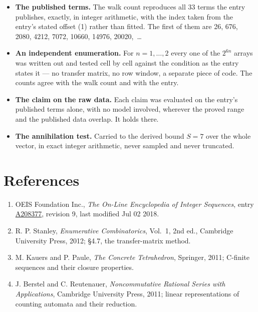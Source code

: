 \documentclass[11pt]{article}
\theoremstyle{definition}
\begin{document}
\begin{itemize}

\item {\bfseries The published terms.} The walk count reproduces all 33 terms the entry publishes, exactly, in integer arithmetic, with the index taken from the entry's stated offset (1) rather than fitted. The first of them are 26, 676, 2080, 4212, 7072, 10660, 14976, 20020,~\dots

\item {\bfseries An independent enumeration.} For $n = 1,\dots,2$ every one of the $2^{6n}$ arrays was written out and tested cell by cell against the condition as the entry states it --- no transfer matrix, no row window, a separate piece of code. The counts agree with the walk count and with the entry.

\item {\bfseries The claim on the raw data.} Each claim was evaluated on the entry's published terms alone, with no model involved, wherever the proved range and the published data overlap. It holds there.

\item {\bfseries The annihilation test.} Carried to the derived bound $S = 7$ over the whole vector, in exact integer arithmetic, never sampled and never truncated.

\end{itemize}

\section{References}

\begin{enumerate}

\item OEIS Foundation Inc., \emph{The On-Line Encyclopedia of Integer Sequences}, entry \href{https://oeis.org/A208377}{A208377}, revision 9, last modified Jul 02 2018.

\item R. P. Stanley, \emph{Enumerative Combinatorics}, Vol.~1, 2nd ed., Cambridge University Press, 2012; \S4.7, the transfer-matrix method.

\item M. Kauers and P. Paule, \emph{The Concrete Tetrahedron}, Springer, 2011; C-finite sequences and their closure properties.

\item J. Berstel and C. Reutenauer, \emph{Noncommutative Rational Series with Applications}, Cambridge University Press, 2011; linear representations of counting automata and their reduction.

\end{enumerate}
\end{document}
